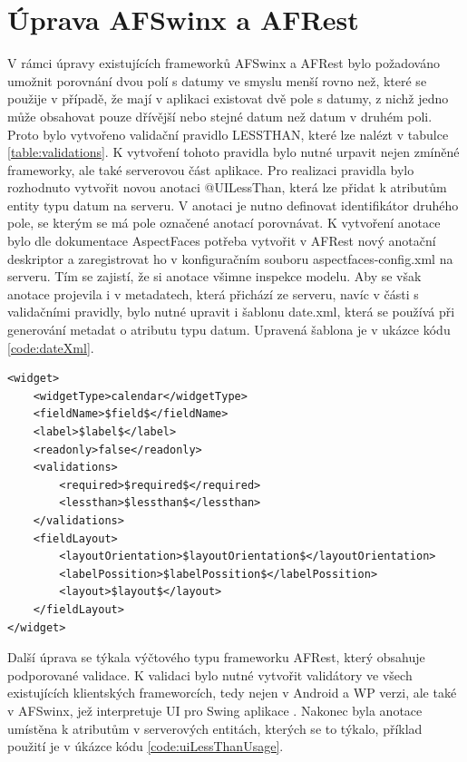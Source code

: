 \section{Úprava AFSwinx a AFRest}
V rámci úpravy existujících frameworků AFSwinx a AFRest \cite{tomasek-thesis} bylo požadováno umožnit porovnání dvou polí s datumy ve smyslu menší rovno než, které se použije v případě, že mají v aplikaci existovat dvě pole s datumy, z nichž jedno může obsahovat pouze dřívější nebo stejné datum než datum v druhém poli. Proto bylo vytvořeno validační pravidlo LESSTHAN, které lze nalézt v tabulce \ref{table:validations}. K vytvoření tohoto pravidla bylo nutné urpavit nejen zmíněné frameworky, ale také serverovou část aplikace. Pro realizaci pravidla bylo rozhodnuto vytvořit novou anotaci @UILessThan, která lze přidat k atributům entity typu datum na serveru. V anotaci je nutno definovat identifikátor druhého pole, se kterým se má pole označené anotací porovnávat. K vytvoření anotace bylo dle dokumentace AspectFaces \cite{aspect-faces} potřeba vytvořit v AFRest nový anotační deskriptor a zaregistrovat ho v konfiguračním souboru aspectfaces-config.xml na serveru. Tím se zajistí, že si anotace všimne inspekce modelu. Aby se však anotace projevila i v metadatech, která přichází ze serveru, navíc v části s validačními pravidly, bylo nutné upravit i šablonu date.xml, která se používá při generování metadat o atributu typu datum. Upravená šablona je v ukázce kódu \ref{code:dateXml}.

\begin{lstlisting}[caption=Upravená šablona date.xml,
label={code:dateXml}, basicstyle=\footnotesize]
<widget>
	<widgetType>calendar</widgetType>
	<fieldName>$field$</fieldName>
	<label>$label$</label>
	<readonly>false</readonly>
	<validations>
		<required>$required$</required>
		<lessthan>$lessthan$</lessthan>
	</validations>
	<fieldLayout>
		<layoutOrientation>$layoutOrientation$</layoutOrientation>
		<labelPossition>$labelPossition$</labelPossition>
		<layout>$layout$</layout>
	</fieldLayout>
</widget>
\end{lstlisting}

Další úprava se týkala výčtového typu frameworku AFRest, který obsahuje podporované validace. K validaci bylo nutné vytvořit validátory ve všech existujících klientských frameworcích, tedy nejen v Android a WP verzi, ale také v AFSwinx, jež interpretuje UI pro Swing aplikace \cite{tomasek-thesis}. Nakonec byla anotace umístěna k atributům v serverových entitách, kterých se to týkalo, příklad použití je v úkázce kódu \ref{code:uiLessThanUsage}.

